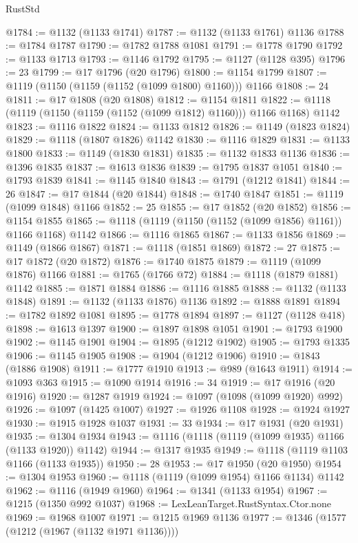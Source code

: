 \begin{lexlean}{RustStd}
\begin{coremodule}
@1784 := @1132 (@1133 @1741)
@1787 := @1132 (@1133 @1761) @1136
@1788 := @1784 @1787
@1790 := @1782 @1788 @1081
@1791 := @1778 @1790
@1792 := @1133 @1713
@1793 := @1146 @1792
@1795 := @1127 (@1128 @395)
@1796 := 23
@1799 := @17 @1796 (@20 @1796)
@1800 := @1154 @1799
@1807 := @1119 (@1150 (@1159 (@1152 (@1099 @1800) @1160))) @1166
@1808 := 24
@1811 := @17 @1808 (@20 @1808)
@1812 := @1154 @1811
@1822 := @1118 (@1119 (@1150 (@1159 (@1152 (@1099 @1812) @1160))) @1166 @1168) @1142
@1823 := @1116 @1822
@1824 := @1133 @1812
@1826 := @1149 (@1823 @1824)
@1829 := @1118 (@1807 @1826) @1142
@1830 := @1116 @1829
@1831 := @1133 @1800
@1833 := @1149 (@1830 @1831)
@1835 := @1132 @1833 @1136
@1836 := @1396 @1835
@1837 := @1613 @1836
@1839 := @1795 @1837 @1051
@1840 := @1793 @1839
@1841 := @1145 @1840
@1843 := @1791 (@1212 @1841)
@1844 := 26
@1847 := @17 @1844 (@20 @1844)
@1848 := @1740 @1847
@1851 := @1119 (@1099 @1848) @1166
@1852 := 25
@1855 := @17 @1852 (@20 @1852)
@1856 := @1154 @1855
@1865 := @1118 (@1119 (@1150 (@1152 (@1099 @1856) @1161)) @1166 @1168) @1142
@1866 := @1116 @1865
@1867 := @1133 @1856
@1869 := @1149 (@1866 @1867)
@1871 := @1118 (@1851 @1869)
@1872 := 27
@1875 := @17 @1872 (@20 @1872)
@1876 := @1740 @1875
@1879 := @1119 (@1099 @1876) @1166
@1881 := @1765 (@1766 @72)
@1884 := @1118 (@1879 @1881) @1142
@1885 := @1871 @1884
@1886 := @1116 @1885
@1888 := @1132 (@1133 @1848)
@1891 := @1132 (@1133 @1876) @1136
@1892 := @1888 @1891
@1894 := @1782 @1892 @1081
@1895 := @1778 @1894
@1897 := @1127 (@1128 @418)
@1898 := @1613 @1397
@1900 := @1897 @1898 @1051
@1901 := @1793 @1900
@1902 := @1145 @1901
@1904 := @1895 (@1212 @1902)
@1905 := @1793 @1335
@1906 := @1145 @1905
@1908 := @1904 (@1212 @1906)
@1910 := @1843 (@1886 @1908)
@1911 := @1777 @1910
@1913 := @989 (@1643 @1911)
@1914 := @1093 @363
@1915 := @1090 @1914
@1916 := 34
@1919 := @17 @1916 (@20 @1916)
@1920 := @1287 @1919
@1924 := @1097 (@1098 (@1099 @1920) @992)
@1926 := @1097 (@1425 @1007)
@1927 := @1926 @1108
@1928 := @1924 @1927
@1930 := @1915 @1928 @1037
@1931 := 33
@1934 := @17 @1931 (@20 @1931)
@1935 := @1304 @1934
@1943 := @1116 (@1118 (@1119 (@1099 @1935) @1166 (@1133 @1920)) @1142)
@1944 := @1317 @1935
@1949 := @1118 (@1119 @1103 @1166 (@1133 @1935))
@1950 := 28
@1953 := @17 @1950 (@20 @1950)
@1954 := @1304 @1953
@1960 := @1118 (@1119 (@1099 @1954) @1166 @1134) @1142
@1962 := @1116 (@1949 @1960)
@1964 := @1341 (@1133 @1954)
@1967 := @1215 (@1350 @992 @1037)
@1968 := LexLeanTarget.RustSyntax.Ctor.none
@1969 := @1968 @1007
@1971 := @1215 @1969 @1136
@1977 := @1346 (@1577 (@1212 (@1967 (@1132 @1971 @1136))))

\end{coremodule}
\end{lexlean}
